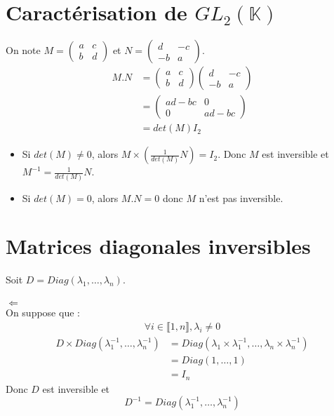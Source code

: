 \documentclass[../main.tex]{subfiles}
\begin{document}
\setcounter{section}{47}
\section{Caractérisation de $GL_2(\mathbb{K})$}
On note $M = 
\begin{pmatrix}
    a & c \\
    b & d
\end{pmatrix}$
et $N =
\begin{pmatrix}
    d & -c \\
    -b & a
\end{pmatrix}$. \\
\begin{align*}
    M.N &= 
    \begin{pmatrix}
        a & c \\
        b & d
    \end{pmatrix}
    \begin{pmatrix}
        d & -c \\
        -b & a
    \end{pmatrix} \\
    &= 
    \begin{pmatrix}
        ad - bc & 0 \\
        0 & ad - bc
    \end{pmatrix} \\
    &= det(M) I_2
\end{align*}
\begin{itemize}
    \item Si $det(M) \neq 0$, alors $M \times \left( \frac{1}{det(M)} N \right) = I_2$. Donc $M$ est inversible et $M^{-1} = \frac{1}{det(M)} N$.
    \item Si $det(M) = 0$, alors $M.N = 0$ donc $M$ n'est pas inversible.
\end{itemize}

\section{Matrices diagonales inversibles}
Soit $D = Diag(\lambda_1, \ldots, \lambda_n)$. \\ \\

$\boxed{\Leftarrow}$ \\
On suppose que : 
\begin{align*}
    \forall i \in \llbracket 1, n \rrbracket, \lambda_i \neq 0
\end{align*}
\begin{align*}
    D \times Diag(\lambda_1^{-1}, \ldots, \lambda_n^{-1}) &= Diag(\lambda_1 \times \lambda_1^{-1}, \ldots, \lambda_n \times \lambda_n^{-1}) \\
    &= Diag(1, \ldots, 1) \\
    &= I_n
\end{align*}
Donc $D$ est inversible et $$D^{-1} = Diag(\lambda_1^{-1}, \ldots, \lambda_n^{-1})$$ \\ \\
\end{document}
